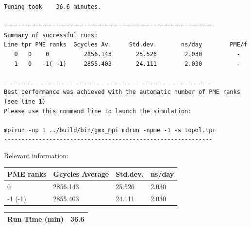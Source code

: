 \begin{lstlisting}[frame=single]
Tuning took    36.6 minutes.

------------------------------------------------------------
Summary of successful runs:
Line tpr PME ranks  Gcycles Av.     Std.dev.       ns/day        PME/f
   0   0    0          2856.143       25.526        2.030          -  
   1   0   -1( -1)     2855.403       24.111        2.030          -  

------------------------------------------------------------
Best performance was achieved with the automatic number of PME ranks (see line 1)
Please use this command line to launch the simulation:

mpirun -np 1 ../build/bin/gmx_mpi mdrun -npme -1 -s topol.tpr  
------------------------------------------------------------

\end{lstlisting}


Relevant information:
\begin{center}
    \begin{tabular}{|p{3.5cm}|p{3.5cm}|p{3.5cm}|p{3.5cm}|} \hline
         PME ranks & Gcycles Average & Std.dev. & ns/day \\ \hline
         0 & 2856.143  & 25.526  & 2.030  \\ \hline
         -1 (-1) & 2855.403 & 24.111 & 2.030  \\ \hline
    \end{tabular}
     \begin{tabular}{|p{3.5cm}|p{11.4cm}|} \hline
         Run Time (min) & 36.6 \\ \hline
    \end{tabular}
\end{center}
